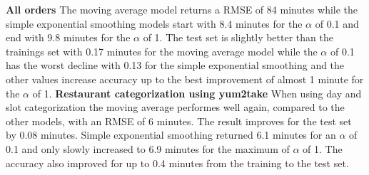 \newline\newline\textbf{All orders}\newline
The moving average model returns a RMSE of 84 minutes while the simple exponential smoothing models start with 8.4 minutes for the $\alpha$ of 0.1 and end with 9.8 minutes for the $\alpha$ of 1. The test set is slightly better than the trainings set with 0.17 minutes for the moving average model while the $\alpha$ of 0.1 has the worst decline with 0.13 for the simple exponential smoothing and the other values increase accuracy up to the best improvement of almost 1 minute for the $\alpha$ of 1.
\newline\newline\textbf{Restaurant categorization using yum2take}\newline
When using day and slot categorization the moving average performes well again, compared to the other models, with an RMSE of 6 minutes. The result improves for the test set by 0.08 minutes. Simple exponential smoothing returned 6.1 minutes for an $\alpha$ of 0.1 and only slowly increased to 6.9 minutes for the maximum of $\alpha$ of 1. The accuracy also improved for up to 0.4 minutes from the training to the test set.
